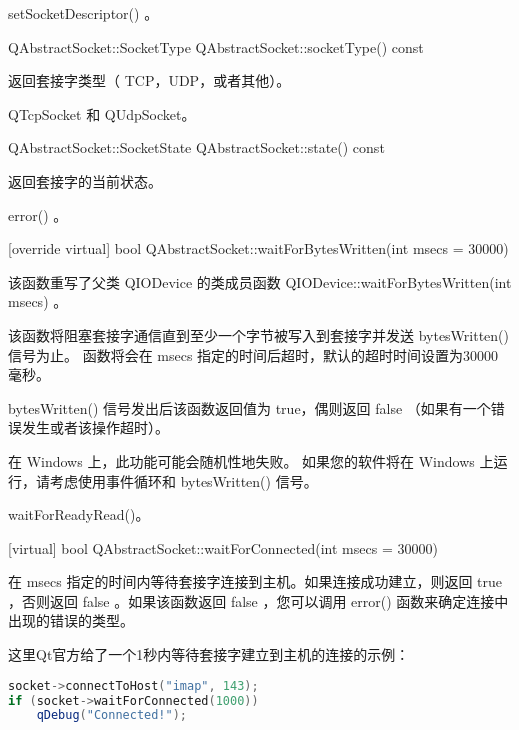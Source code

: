 \begin{notice}[另请查阅]
setSocketDescriptor() 。
\end{notice}

QAbstractSocket::SocketType QAbstractSocket::socketType() const

返回套接字类型（ TCP，UDP，或者其他）。

\begin{notice}[另请查阅]
QTcpSocket 和 QUdpSocket。
\end{notice}



QAbstractSocket::SocketState QAbstractSocket::state() const

返回套接字的当前状态。


\begin{notice}[另请查阅]
error() 。
\end{notice}

[override virtual] bool QAbstractSocket::waitForBytesWritten(int msecs
= 30000)

该函数重写了父类 QIODevice 的类成员函数 QIODevice::waitForBytesWritten(int msecs) 。

该函数将阻塞套接字通信直到至少一个字节被写入到套接字并发送 bytesWritten() 信号为止。 函数将会在 msecs 指定的时间后超时，默认的超时时间设置为30000毫秒。

bytesWritten() 信号发出后该函数返回值为 true，偶则返回 false （如果有一个错误发生或者该操作超时）。

\begin{notice}
在 Windows 上，此功能可能会随机性地失败。 如果您的软件将在 Windows 上运行，请考虑使用事件循环和 bytesWritten() 信号。
\end{notice}

\begin{notice}[另请查阅]
waitForReadyRead()。
\end{notice}

[virtual] bool QAbstractSocket::waitForConnected(int msecs = 30000)

在 msecs 指定的时间内等待套接字连接到主机。如果连接成功建立，则返回 true ，否则返回 false 。如果该函数返回 false ，您可以调用 error() 函数来确定连接中出现的错误的类型。

这里Qt官方给了一个1秒内等待套接字建立到主机的连接的示例：


\begin{lstlisting}[language=C++]
socket->connectToHost("imap", 143);
if (socket->waitForConnected(1000))
	qDebug("Connected!");
\end{lstlisting}

